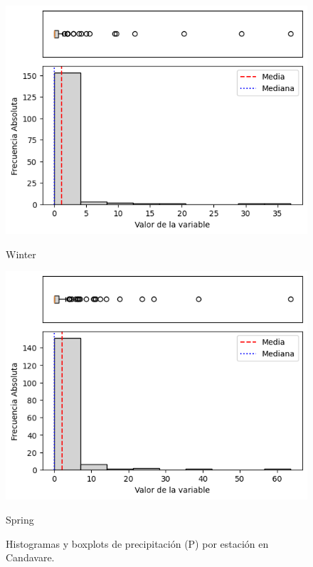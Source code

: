 \begin{figure}[H]
\begin{minipage}{0.30\textwidth}
  \includegraphics[width=\linewidth]{resultados/por_estacion_del_anio/boxplot_clases_por_estacion/Candavare/P_HistBoxplot_Winter.png}
  \caption*{Winter}
\end{minipage}
\hfill
\begin{minipage}{0.30\textwidth}
  \includegraphics[width=\linewidth]{resultados/por_estacion_del_anio/boxplot_clases_por_estacion/Candavare/P_HistBoxplot_Spring.png}
  \caption*{Spring}
\end{minipage}
\caption{Histogramas y boxplots de precipitación (P) por estación en Candavare.}
\label{fig:candavare_p_hist}
\end{figure}

